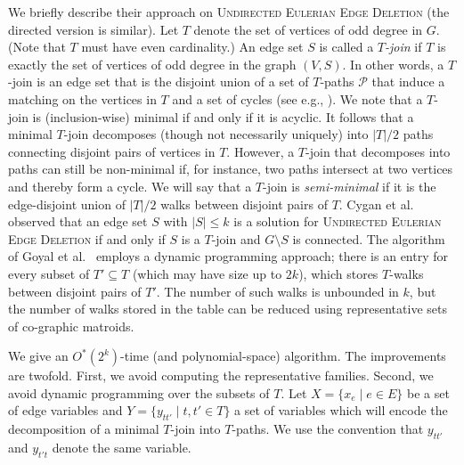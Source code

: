 \documentclass{theoretics}
\begin{document}
We briefly describe their approach on \textsc{Undirected Eulerian Edge Deletion} (the directed version is similar).
Let $T$ denote the set of vertices of odd degree in $G$. (Note that $T$ must have even cardinality.)
An edge set $S$ is called a \emph{$T$-join} if $T$ is exactly the set of vertices of odd degree in the graph $(V, S)$.
In other words, a $T$-join is an edge set that is the disjoint union of a set of $T$-paths $\mathcal{P}$ that induce a matching on the vertices in $T$ and a set of cycles (see e.g., \cite{Schrijver}). 
We note that a $T$-join is (inclusion-wise) minimal if and only if it is acyclic. 
It follows that a minimal $T$-join decomposes (though not necessarily uniquely) into $|T|/2$ paths connecting disjoint pairs of vertices in $T$.
However, a $T$-join that decomposes into paths can still be non-minimal if, for instance, two paths intersect at two vertices and thereby form a cycle.
We will say that a $T$-join is \emph{semi-minimal} if it is the edge-disjoint union of $|T|/2$ walks between disjoint pairs of $T$.
Cygan et al.~\cite{CyganMPPS14euler} observed that an edge set $S$ with $|S| \le k$ is a solution for \textsc{Undirected Eulerian Edge Deletion} if and only if $S$ is a $T$-join and $G \setminus S$ is connected.
The algorithm of Goyal et al.~\cite{GoyalMPPS18even} employs a dynamic programming approach; there is an entry for every subset of $T' \subseteq T$ (which may have size up to $2k$), which stores $T$-walks between disjoint pairs of $T'$.
The number of such walks is unbounded in $k$, but the number of walks stored in the table can be reduced using representative sets of co-graphic matroids.

We give an $O^*(2^k)$-time (and polynomial-space) algorithm.
The improvements are twofold.
First, we avoid computing the representative families.
Second, we avoid dynamic programming over the subsets of $T$.
Let $X = \{ x_e \mid e \in E \}$ be a set of edge variables
and $Y = \{y_{tt'} \mid t, t' \in T\}$ a set of variables which will encode
the decomposition of a minimal $T$-join into $T$-paths. We use the convention
that $y_{tt'}$ and $y_{t't}$ denote the same variable. 
\end{document}
